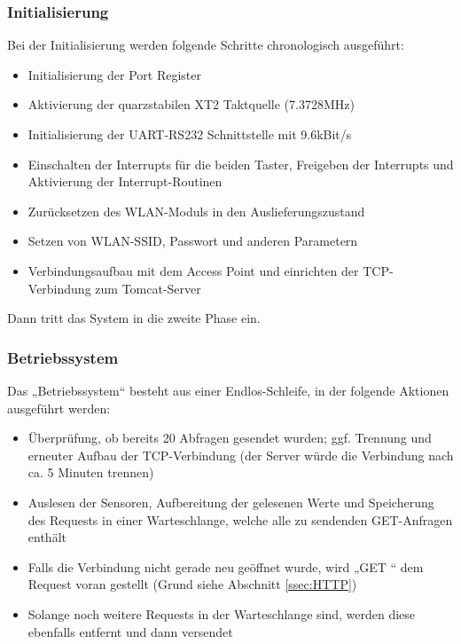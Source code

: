 \documentclass[12pt,a4paper,twoside]{article}
\begin{document}
\subsubsection{Initialisierung}
Bei der Initialisierung werden folgende Schritte chronologisch ausgeführt: 

\begin{itemize}
 \item Initialisierung der Port Register
 \item Aktivierung der quarzstabilen XT2 Taktquelle (7.3728MHz)
 \item Initialisierung der UART-RS232 Schnittstelle mit 9.6kBit/s
 \item Einschalten der Interrupts für die beiden Taster, Freigeben der Interrupts und  Aktivierung der Interrupt-Routinen
 \item Zurücksetzen des WLAN-Moduls in den Auslieferungszustand
 \item Setzen von WLAN-SSID, Passwort und anderen Parametern
 \item Verbindungsaufbau mit dem Access Point und einrichten der TCP-Verbindung zum Tomcat-Server
\end{itemize}
Dann tritt das System in die zweite Phase ein.

\subsubsection{Betriebssystem}

Das „Betriebssystem“ besteht aus einer Endlos-Schleife, in der folgende Aktionen ausgeführt werden:
\begin{itemize}
 \item Überprüfung, ob bereits 20 Abfragen gesendet wurden; ggf. Trennung und erneuter Aufbau der TCP-Verbindung (der Server würde die Verbindung nach ca. 5 Minuten trennen)
 \item Auslesen der Sensoren, Aufbereitung der gelesenen Werte und Speicherung des Requests in einer Warteschlange, welche alle zu sendenden GET-Anfragen enthält
 \item Falls die Verbindung nicht gerade neu geöffnet wurde, wird „GET “ dem Request voran gestellt (Grund siehe Abschnitt \ref{ssec:HTTP})
 \item Solange noch weitere Requests in der Warteschlange sind, werden diese ebenfalls entfernt und dann versendet
\end{itemize}
\end{document}
